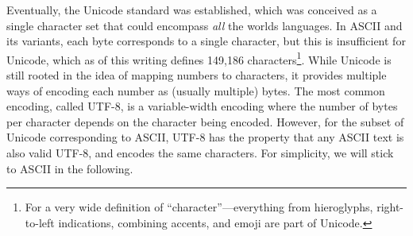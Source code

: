 Eventually, the Unicode standard was established, which was conceived
as a single character set that could encompass \emph{all} the worlds
languages.  In ASCII and its variants, each byte corresponds to a
single character, but this is insufficient for Unicode, which as of
this writing defines 149,186 characters\footnote{For a very wide
  definition of ``character''---everything from hieroglyphs,
  right-to-left indications, combining accents, and emoji are part of
  Unicode.}.  While Unicode is still rooted in the idea of mapping
numbers to characters, it provides multiple ways of encoding each
number as (usually multiple) bytes.  The most common encoding, called
UTF-8, is a variable-width encoding where the number of bytes per
character depends on the character being encoded.  However, for the
subset of Unicode corresponding to ASCII, UTF-8 has the property that
any ASCII text is also valid UTF-8, and encodes the same characters.
For simplicity, we will stick to ASCII in the following.

